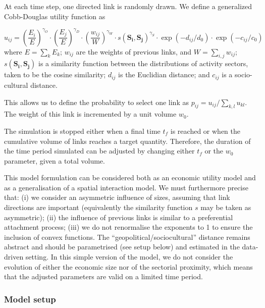 \documentclass[10pt,letterpaper]{article}
\begin{document}
At each time step, one directed link is randomly drawn. We define a generalized Cobb-Douglas utility function \cite{vilcu2011geometric} as 

\begin{equation}
u_{ij} = \left(\frac{E_{i}}{E}\right)^{\gamma_O} \cdot \left(\frac{E_{j}}{E}\right)^{\gamma_D} \cdot \left(\frac{w_{ij}}{W}\right)^{\gamma_W} \cdot s\left(\mathbf{S_{i}},\mathbf{S_{j}}\right)^{\gamma_S} \cdot \exp \left(- d_{ij} / d_0\right) \cdot \exp \left(- c_{ij} / c_0\right)
\end{equation}
where $E  =  \sum_k E_k$; $w_{ij}$ are the weights of previous links, and $W  = \sum_{i,j} w_{ij}$; $s(\mathbf{S_{i}},\mathbf{S_{j}})$ is a similarity function between the distributions of activity sectors, taken to be the cosine similarity; $d_{ij}$ is the Euclidian distance; and $c_{ij}$ is a socio-cultural distance.

This allows us to define the probability to select one link as $p_{ij} = u_{ij} / \sum_{k,l} u_{kl}$. The weight of this link is incremented by a unit volume $w_0$.

The simulation is stopped either when a final time $t_f$ is reached or when the cumulative volume of links reaches a target quantity. Therefore, the duration of the time period simulated can be adjusted by changing either $t_f$ or the $w_0$ parameter, given a total volume. 



This model formulation can be considered both as an economic utility model and as a generalisation of a spatial interaction model. We must furthermore precise that: (i) we consider an asymmetric influence of sizes, assuming that link directions are important (equivalently the similarity function $s$ may be taken as asymmetric); (ii) the influence of previous links is similar to a preferential attachment process; (iii) we do not renormalise the exponents to 1 to ensure the inclusion of convex functions. The ``geopolitical/sociocultural'' distance remains abstract and should be parametrised (see setup below) and estimated in the data-driven setting. In this simple version of the model, we do not consider the evolution of either the economic size nor of the sectorial proximity, which means that the adjusted parameters are valid on a limited time period.


\subsubsection*{Model setup}
\end{document}
